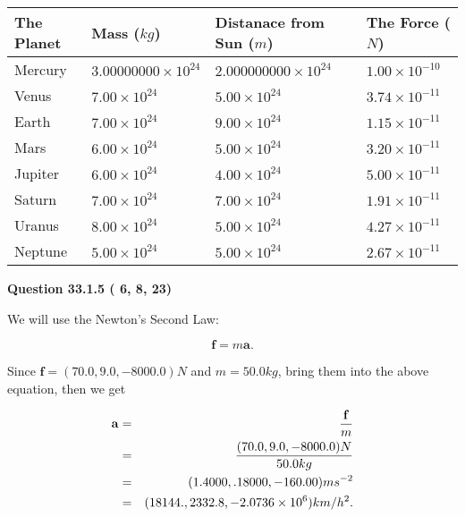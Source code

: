 \documentclass[12pt]{article}
\begin{document}
 
\begin{tabular}{|l|l|l|l|}
\hline
The Planet & Mass ($kg$) & Distanace from Sun ($m$) & The Force ($N$)\\
\hline
Mercury  &
           $ %
3.00000000 \times 10^{24} $   &
             $ %
2.000000000 \times 10^{24} $    & $ %
1.00 \times 10^{-10} $
\\  \hline
Venus    &
           $  %
7.00 \times 10^{24}  $     &
             $ %
5.00 \times 10^{24} $    & $ %
3.74 \times 10^{-11} $
\\  \hline
Earth    &
           $  %
7.00 \times 10^{24}  $     &
             $ %
9.00 \times 10^{24} $    & $ %
1.15 \times 10^{-11} $
\\   \hline
Mars     &
           $  %
6.00 \times 10^{24} $     &
             $ %
5.00 \times 10^{24} $    & $ %
3.20 \times 10^{-11} $
\\   \hline
Jupiter  &
           $  %
6.00 \times 10^{24} $    &
             $ %
4.00 \times 10^{24} $    & $ %
5.00 \times 10^{-11} $
\\  \hline
Saturn   &
           $  %
7.00 \times 10^{24} $    &
             $ %
7.00 \times 10^{24}  $    & $ %
1.91 \times 10^{-11} $
\\  \hline
Uranus   &
           $  %
8.00 \times 10^{24} $    &
             $ %
5.00 \times 10^{24} $    & $ %
4.27 \times 10^{-11} $
\\  \hline
Neptune  &
           $  %
5.00 \times 10^{24} $    &
             $ %
5.00 \times 10^{24} $    & $ %
2.67 \times 10^{-11} $
\\  \hline
 
\end{tabular}
 
 
 
 
  
\vspace{0.2in}
  
{\textbf{\Large{Question
33.1.5 
 (          6,          8,         23)
}}}
  
  
 
 

We will use the Newton's Second Law:
 
\[
\mathbf{f}=m\mathbf{a}.
\]
 
Since $\mathbf{f}=( %
70.0,  %
9.0,  %
-8000.0 )N$
and $m= %
50.0kg$, bring them into the above equation, then we get
 
\begin{eqnarray*}
\mathbf{a}&=&\frac{\mathbf{f}}m  \\
&=&\frac{(
70.0 ,
9.0 ,
-8000.0 )N
}{ %
50.0 kg}  \\
&=&(
1.4000 ,
.18000,
-160.00
)ms^{-2} \\
&=&(
18144. ,
2332.8 ,
-2.0736 \times 10^{6}
)km/h^2.
\end{eqnarray*}
 
\end{document}
